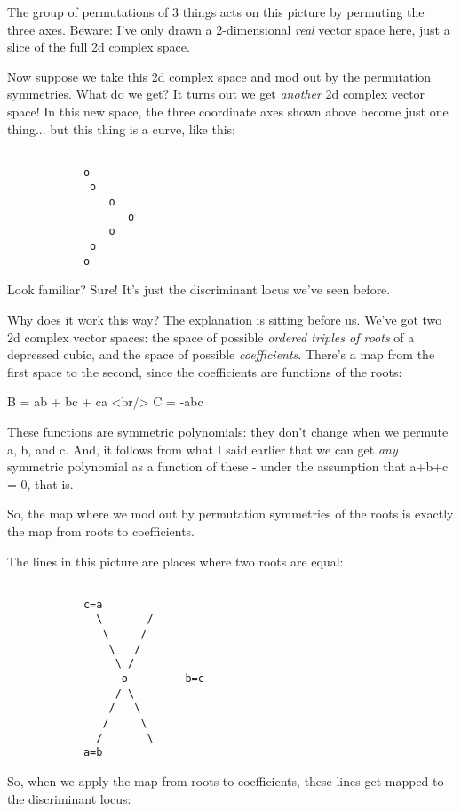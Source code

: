 The group of permutations of 3 things acts on this picture 
by permuting the three axes.  Beware: I've only drawn a 2-dimensional 
\emph{real} vector space here, just a slice of the full 2d complex space.  

Now suppose we take this 2d complex space and mod out by the 
permutation symmetries.  What do we get?  It turns out we get \emph{another}
2d complex vector space!   In this new space, the three coordinate axes
shown above become just one thing... but this thing is a curve, like
this:


\begin{verbatim}

            o
             o
                o
                   o
                o
             o
            o
\end{verbatim}
    
Look familiar?  Sure!  It's just the discriminant locus we've
seen before.

Why does it work this way?  The explanation is sitting before us.
We've got two 2d complex vector spaces: the space of possible
\emph{ordered triples of roots} of a depressed cubic, and the space
of possible \emph{coefficients}.  There's a map from the first space
to the second, since the coefficients are functions of the roots:

B = ab + bc + ca <br/>
C = -abc

These functions are symmetric polynomials: they don't change when
we permute a, b, and c.  And, it follows from what I said earlier 
that we can get \emph{any} symmetric polynomial as a function of these -
under the assumption that a+b+c = 0, that is.  

So, the map where we mod out by permutation symmetries of the roots 
is exactly the map from roots to coefficients.

The lines in this picture are places where two roots are equal:


\begin{verbatim}

            c=a        
              \       /
               \     /
                \   /
                 \ /
          --------o-------- b=c
                 / \
                /   \
               /     \
              /       \
            a=b
\end{verbatim}
    
So, when we apply the map from roots to coefficients, these lines
get mapped to the discriminant locus:



